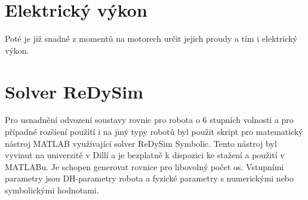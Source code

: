 \section{Elektrický výkon}
Poté je již snadné z momentů na motorech určit jejich proudy a tím i elektrický výkon.

\section{Solver ReDySim}

Pro usnadnění odvození soustavy rovnic pro robota o 6 stupních volnosti a pro případné rozšíení použití i na jiný typy robotů byl použit skript pro matematický nástroj MATLAB využívající solver ReDySim Symbolic\cite{redysim}. Tento nástroj byl vyvinut na univerzitě v Dillí a je bezplatně k dispozici ke stažení a použití v MATLABu. Je schopen generovat rovnice pro libovolný počet os. Vstupními parametry jsou DH-parametry robota a fyzické parametry s numerickými nebo symbolickými hodnotami. 


